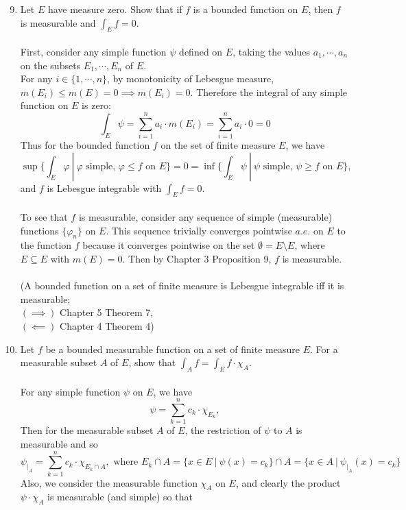 \begin{enumerate}
	\setcounter{enumi}{8}
    \item Let $E$ have measure zero. Show that if $f$ is a bounded function on $E$, then $f$ is measurable and $\int_Ef=0$.\\
    \\First, consider any simple function $\psi$ defined on $E$, taking the values $a_1,\cdots,a_n$ on the subsets $E_1,\cdots,E_n$ of $E$.
    \\For any $i\in\{1,\cdots,n\}$, by monotonicity of Lebesgue measure, $m(E_i)\le m(E)=0\implies m(E_i)=0$.
    Therefore the integral of any simple function on $E$ is zero:
    \[
        \int_E\psi=\sum_{i=1}^n a_i\cdot m(E_i)=\sum_{i=1}^n a_i\cdot 0=0
    \]
    Thus for the bounded function $f$ on the set of finite measure $E$, we have
    \[
        \sup\biggl\{\int_E\varphi\ |\ \varphi\text{ simple, }\varphi\le f\text{ on }E\biggr\}=0=\inf\biggl\{\int_E\psi\ |\ \psi\text{ simple, }\psi\ge f\text{ on }E\biggr\},
    \]
    and $f$ is Lebesgue integrable with $\int_Ef=0$.\\
    \\To see that $f$ is measurable, consider any sequence of simple (measurable) functions $\{\varphi_n\}$ on $E$.
    This sequence trivially converges pointwise $a.e.$ on $E$ to the function $f$ because it converges pointwise on the set $\emptyset=E\setminus E$, where $E\subseteq E$ with $m(E)=0$.
    Then by Chapter 3 Proposition 9, $f$ is measurable.\\
    \\(A bounded function on a set of finite measure is Lebesgue integrable iff it is measurable;
    \\$(\implies)$ Chapter 5 Theorem 7, 
    \\$(\impliedby)$ Chapter 4 Theorem 4)
    \item Let $f$ be a bounded measurable function on a set of finite measure $E$. For a measurable subset $A$ of $E$, show that $\int_Af=\int_Ef\cdot\chi_A$.\\
    \\For any simple function $\psi$ on $E$, we have
    \[
        \psi=\sum_{k=1}^nc_k\cdot \chi_{E_k},
    \]
    Then for the measurable subset $A$ of $E$, the restriction of $\psi$ to $A$ is measurable and so
    \[
        \psi_{|_A}=\sum_{k=1}^nc_k\cdot \chi_{E_k\cap A},\text{ where }E_k\cap A=\{x\in E\ |\ \psi(x)=c_k\}\cap A =\{x\in A\ |\ \psi_{|_A}(x)=c_k\}
    \]
    Also, we consider the measurable function $\chi_A$ on $E$, and clearly the product $\psi\cdot\chi_A$ is measurable (and simple) so that

\end{enumerate}
